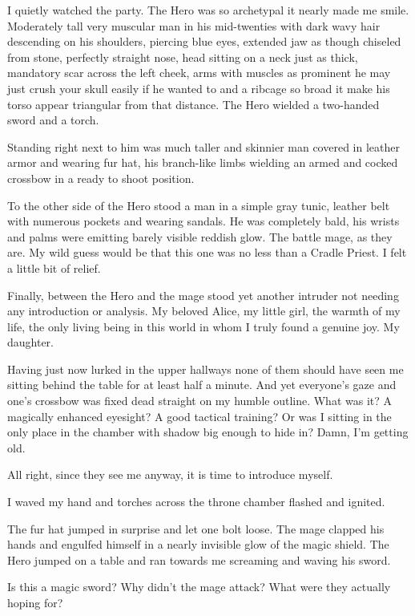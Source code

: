 I quietly watched the party. The Hero was so archetypal it nearly made me smile. Moderately tall very muscular man in his mid-twenties with dark wavy hair descending on his shoulders, piercing blue eyes, extended jaw as though chiseled from stone, perfectly straight nose, head sitting on a neck just as thick, mandatory scar across the left cheek, arms with muscles as prominent he may just crush your skull easily if he wanted to and a ribcage so broad it make his torso appear triangular from that distance. The Hero wielded a two-handed sword and a torch.

Standing right next to him was much taller and skinnier man covered in leather armor and wearing fur hat, his branch-like limbs wielding an armed and cocked crossbow in a ready to shoot position.

To the other side of the Hero stood a man in a simple gray tunic, leather belt with numerous pockets and wearing sandals. He was completely bald, his wrists and palms were emitting barely visible reddish glow. The battle mage, as they are. My wild guess would be that this one was no less than a Cradle Priest. I felt a little bit of relief.

Finally, between the Hero and the mage stood yet another intruder not needing any introduction or analysis. My beloved Alice, my little girl, the warmth of my life, the only living being in this world in whom I truly found a genuine joy. My daughter.

Having just now lurked in the upper hallways none of them should have seen me sitting behind the table for at least half a minute. And yet everyone's gaze and one's crossbow was fixed dead straight on my humble outline. What was it? A magically enhanced eyesight? A good tactical training? Or was I sitting in the only place in the chamber with shadow big enough to hide in? Damn, I'm getting old.

All right, since they see me anyway, it is time to introduce myself.

 I waved my hand and torches across the throne chamber flashed and ignited. 

The fur hat jumped in surprise and let one bolt loose. The mage clapped his hands and engulfed himself in a nearly invisible glow of the magic shield. The Hero jumped on a table and ran towards me screaming and waving his sword.

Is this a magic sword? Why didn't the mage attack? What were they actually hoping for?

